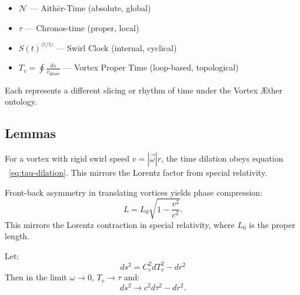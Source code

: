     \begin{tcolorbox}[title=Key Temporal Variables in VAM]
        \begin{itemize}
            \item \( \mathcal{N} \) — Aithēr-Time (absolute, global)
            \item \( \tau \) — Chronos-time (proper, local)
            \item \( S(t)^{\circlearrowleft/\circlearrowright} \) — Swirl Clock (internal, cyclical)
            \item \( T_v = \oint \frac{ds}{v_{\text{phase}}} \) — Vortex Proper Time (loop-based, topological)
        \end{itemize}
        Each represents a different slicing or rhythm of time under the Vortex Æther ontology.
    \end{tcolorbox}


    \subsection{Lemmas}

    \begin{lemma*}
        For a vortex with rigid swirl speed \( v = |\vec{\omega}| r \), the time dilation obeys equation ~\eqref{eq:tau-dilation}. This mirrors the Lorentz factor from special relativity.
    \end{lemma*}

    \begin{lemma*}
        Front-back asymmetry in translating vortices yields phase compression:
        \begin{equation}
            \boxed{
                L = L_0 \sqrt{1 - \frac{v^2}{c^2}}.
            }
            \label{eq:lorentz-length-contraction}
        \end{equation}
        This mirrors the Lorentz contraction in special relativity, where \( L_0 \) is the proper length.
    \end{lemma*}

    \begin{lemma*}
        Let:
        \begin{equation}
            \boxed{
                ds^2 = C_e^2 dT_v^2 - dr^2
            }
            \label{eq:swirl-metric}
        \end{equation}
        Then in the limit \( \omega \to 0 \), \( T_v \to \tau \) and:
        \[
            ds^2 \to c^2 d\tau^2 - dr^2.
        \]
    \end{lemma*}

